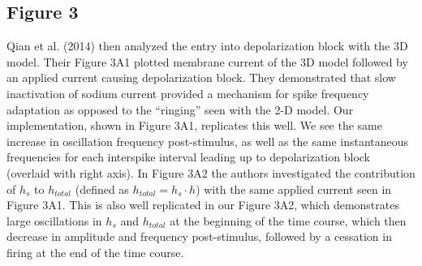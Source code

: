 \subsection{Figure 3}
Qian et al. (2014) then analyzed the entry into depolarization block with the 3D model. Their Figure 3A1 plotted membrane current of the 3D model followed by an applied current causing depolarization block. They demonstrated that slow inactivation of sodium current provided a mechanism for spike frequency adaptation as opposed to the ``ringing'' seen with the 2-D model. Our implementation, shown in Figure 3A1, replicates this well. We see the same increase in oscillation frequency post-stimulus, as well as the same instantaneous frequencies for each interspike interval leading up to depolarization block (overlaid with right axis). In Figure 3A2 the authors investigated the contribution of $h_s$ to $h_{total}$ (defined as $h_{total}= h_{s}\cdot h$) with the same applied current seen in Figure 3A1. This is also well replicated in our Figure 3A2, which demonstrates large oscillations in $h_s$ and $h_{total}$ at the beginning of the time course, which then decrease in amplitude and frequency post-stimulus, followed by a cessation in firing at the end of the time course.

